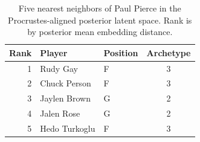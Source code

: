 \begin{table}[htbp]
  \centering\small
  \begin{tabular}{rllc}
    \toprule
    Rank & Player & Position & Archetype \\
    \midrule
    1 & Rudy Gay & F & 3 \\
    2 & Chuck Person & F & 3 \\
    3 & Jaylen Brown & G & 2 \\
    4 & Jalen Rose & G & 2 \\
    5 & Hedo Turkoglu & F & 3 \\
    \bottomrule
  \end{tabular}
  \caption{Five nearest neighbors of Paul Pierce in the Procrustes-aligned posterior latent space. Rank is by posterior mean embedding distance.}
  \label{tab:Paul_Pierce_neighbors}
\end{table}

